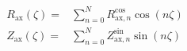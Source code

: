 \documentclass[a4paper, 12pt]{article}
\begin{document}
\begin{align*}
R_\mathrm{ax}(\zeta) =& \sum\limits_{n=0}^{N}   R_{\mathrm{ax}, n}^\mathrm{cos} \cos \left( n \zeta \right) \\
Z_\mathrm{ax}(\zeta) =& \sum\limits_{n=0}^{N}   Z_{\mathrm{ax}, n}^\mathrm{sin} \sin \left( n \zeta \right)
\end{align*}
\end{document}
